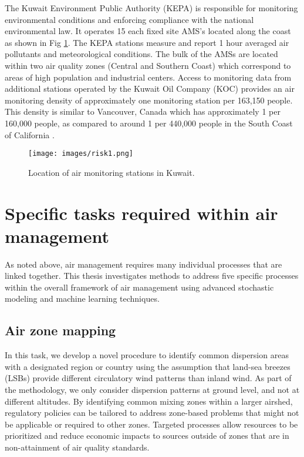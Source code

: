 The Kuwait Environment Public Authority (KEPA) is responsible for monitoring environmental conditions and enforcing compliance with the national environmental law. It operates 15 each fixed site AMS’s located along the coast as shown in Fig \ref{fig1:amskuwait}.  The KEPA stations measure and report 1 hour averaged air pollutants and meteorological conditions. The bulk of the AMSs are located within two air quality zones (Central and Southern Coast) which correspond to areas of high population and industrial centers. Access to monitoring data from additional stations operated by the Kuwait Oil Company (KOC) provides an air monitoring density of approximately one monitoring station per 163,150 people. This density is similar to Vancouver, Canada which has approximately 1 per 160,000 people, as compared to around 1 per 440,000 people in the South Coast of California \citep{Marshall2008}.

%  
\begin{figure}[H]
\centering
\texttt{[image: images/risk1.png]} 
\caption{Location of air monitoring stations in Kuwait.}
\label{fig1:amskuwait}
\end{figure}

\section{Specific tasks required within air management}
As noted above, air management requires many individual processes that are linked together. This thesis investigates methods to address five specific processes within the overall framework of air management using advanced stochastic modeling and machine learning techniques.

\subsection{Air zone mapping}

In this task, we develop a novel procedure to identify common dispersion areas with a designated region or country using the assumption that land-sea breezes (LSBs) provide different circulatory wind patterns than inland wind. As part of the methodology, we only consider dispersion patterns at ground level, and not at different altitudes. By identifying common mixing zones within a larger airshed, regulatory policies can be tailored to address zone-based problems that might not be applicable or required to other zones. Targeted processes allow resources to be prioritized and reduce economic impacts to sources outside of zones that are in non-attainment of air quality standards.

